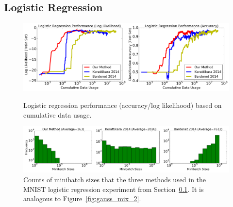 \documentclass[twoside]{article} \usepackage{aistats2017}
\begin{document}
\begin{table}[h]
    \caption{Gaussian Mixture Model Statistics}
    \label{tab:poissons}
    \centering
\end{table}


\subsection{Logistic Regression}\label{ssec:logistic}
\begin{figure}
	\centering
	\includegraphics[width=\linewidth]{logistic_performance.png}
	\caption{
    Logistic regression performance (accuracy/log likelihood) based on
    cumulative data usage.
    }
	\label{fig:logistic_performance}
	\centering
	\includegraphics[width=\linewidth]{minibatch_size_logistic.png}
	\caption{
    Counts of minibatch sizes that the three methods used in the MNIST logistic
    regression experiment from Section~\ref{ssec:logistic}. It is analogous to
    Figure~\ref{fig:gauss_mix_2}.
    }
	\label{fig:logistic_minibatch}
\end{figure}
\end{document}
